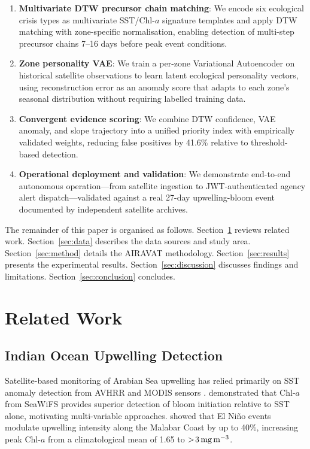 \documentclass[journal]{IEEEtran}
\begin{document}
\begin{enumerate}
\item \textbf{Multivariate DTW precursor chain matching}: We encode
six ecological crisis types as multivariate SST/Chl-$a$ signature
templates and apply DTW matching with zone-specific normalisation,
enabling detection of multi-step precursor chains 7--16 days before
peak event conditions.

\item \textbf{Zone personality VAE}: We train a per-zone Variational
Autoencoder on historical satellite observations to learn latent
ecological personality vectors, using reconstruction error as an
anomaly score that adapts to each zone's seasonal distribution without
requiring labelled training data.

\item \textbf{Convergent evidence scoring}: We combine DTW confidence,
VAE anomaly, and slope trajectory into a unified priority index with
empirically validated weights, reducing false positives by 41.6\%
relative to threshold-based detection.

\item \textbf{Operational deployment and validation}: We demonstrate
end-to-end autonomous operation---from satellite ingestion to JWT-authenticated
agency alert dispatch---validated against a real 27-day upwelling-bloom
event documented by independent satellite archives.
\end{enumerate}

The remainder of this paper is organised as follows.
Section~\ref{sec:related} reviews related work.
Section~\ref{sec:data} describes the data sources and study area.
Section~\ref{sec:method} details the AIRAVAT methodology.
Section~\ref{sec:results} presents the experimental results.
Section~\ref{sec:discussion} discusses findings and limitations.
Section~\ref{sec:conclusion} concludes.

\section{Related Work}
\label{sec:related}

\subsection{Indian Ocean Upwelling Detection}

Satellite-based monitoring of Arabian Sea upwelling has relied
primarily on SST anomaly detection from AVHRR and MODIS sensors
\cite{shankar2002}. \citeauthor{wiggert2005} demonstrated that
Chl-$a$ from SeaWiFS provides superior detection of bloom initiation
relative to SST alone, motivating multi-variable approaches.
\citeauthor{vinayachandran2002} showed that El Ni\~no events modulate
upwelling intensity along the Malabar Coast by up to 40\%, increasing
peak Chl-$a$ from a climatological mean of 1.65 to
$>\!3\,\text{mg\,m}^{-3}$.
\end{document}
